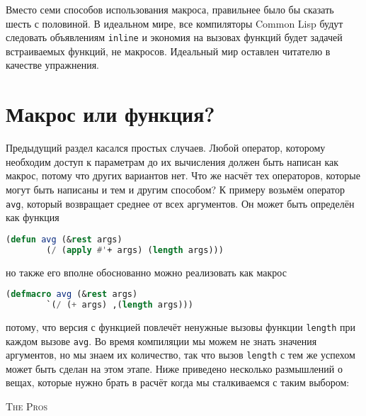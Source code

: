 \documentclass[12pt, a4paper]{article} %
\begin{document}
Вместо семи способов использования макроса, правильнее было бы сказать шесть с половиной. В идеальном мире, все компиляторы Common Lisp будут следовать объявлениям \texttt{inline} и экономия на вызовах функций будет задачей встраиваемых функций, не макросов. Идеальный мир оставлен читателю в качестве упражнения. 

\section{Макрос или функция?}

Предыдущий раздел касался простых случаев. Любой оператор, которому необходим доступ к параметрам до их вычисления должен быть написан как макрос, потому что других вариантов нет. Что же насчёт тех операторов, которые могут быть написаны и тем и другим способом? К примеру возьмём оператор \texttt{avg}, который возвращает среднее от всех аргументов. Он может быть определён как функция
\begin{lstlisting}[language=Lisp]
    (defun avg (&rest args)
        (/ (apply #'+ args) (length args)))
\end{lstlisting}
но также его вполне обоснованно можно реализовать как макрос
\begin{lstlisting}[language=Lisp]
    (defmacro avg (&rest args)
        `(/ (+ args) ,(length args)))
\end{lstlisting}
потому, что версия с функцией повлечёт ненужные вызовы функции \texttt{length} при каждом вызове \texttt{avg}. Во время компиляции мы можем не знать значения аргументов, но мы знаем их количество, так что вызов \texttt{length} с тем же успехом может быть сделан на этом этапе. Ниже приведено несколько размышлений о вещах, которые нужно брать в расчёт когда мы сталкиваемся с таким выбором:
\begin{center}
    \textsc{The Pros}
\end{center}
\end{document}
